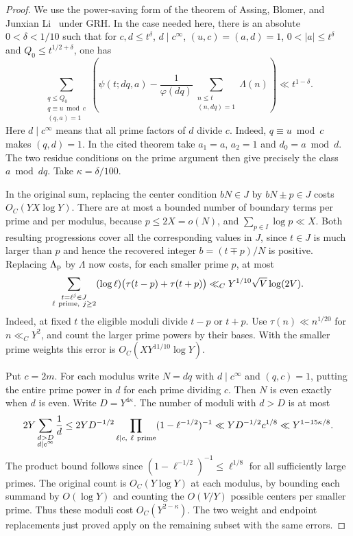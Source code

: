 \documentclass[11pt,a4paper]{article}
\numberwithin{equation}{section}
\begin{document}
\begin{proof}
We use the power-saving form of the theorem of Assing, Blomer,
and Junxian Li~\cite[Theorem~2.1]{AssingBlomerLi} under GRH.
In the case needed here, there is an absolute $0<\delta<1/10$
such that for $c,d\le t^\delta$, $d\mid c^\infty$,
$(u,c)=(a,d)=1$, $0<|a|\le t^\delta$ and $Q_0\le t^{1/2+\delta}$,
one has
\begin{equation}
 \sum_{\substack{q\le Q_0\\q\equiv u\bmod c\\(q,a)=1}}
 \left(
  \psi(t;dq,a)
     -\frac{1}{\varphi(dq)}\sum_{\substack{n\le t\\(n,dq)=1}}\Lambda(n)
 \right)
 \ll t^{1-\delta}.
 \label{eq:criticalgridmodulusabl}
\end{equation}
Here $d\mid c^\infty$ means that all prime factors of $d$
divide $c$. Indeed, $q\equiv u\bmod c$ makes $(q,d)=1$.
In the cited theorem take $a_1=a$, $a_2=1$ and $d_0=a\bmod d$.
The two residue conditions on the prime argument then give
precisely the class $a\bmod dq$. Take $\kappa=\delta/100$.

In the original sum, replacing the center condition $bN\in J$
by $bN\pm p\in J$ costs $O_C(YX\log Y)$. There are at most a
bounded number of boundary terms per prime and per modulus,
because $p\le2X=o(N)$, and $\sum_{p\in I}\log p\ll X$.
Both resulting progressions cover all the corresponding values
in $J$, since $t\in J$ is much larger than $p$ and hence the
recovered integer $b=(t\mp p)/N$ is positive.
Replacing $\Lambda_{\rm p}$ by $\Lambda$ now costs, for each
smaller prime $p$, at most
\[
 \sum_{\substack{t=\ell^j\in J\\\ell\ {\rm prime},\ j\ge2}}
       (\log\ell)\bigl(\tau(t-p)+\tau(t+p)\bigr)
 \ll_C Y^{1/10}\sqrt V\log(2V).
\]
Indeed, at fixed $t$ the eligible moduli divide $t-p$ or $t+p$.
Use $\tau(n)\ll n^{1/20}$ for $n\ll_C Y^2$, and count the
larger prime powers by their bases. With the smaller prime weights
this error is $O_C(XY^{11/10}\log Y)$.

Put $c=2m$. For each modulus write $N=dq$ with
$d\mid c^\infty$ and $(q,c)=1$, putting the entire prime power
in $d$ for each prime dividing $c$. Then $N$ is even exactly
when $d$ is even. Write $D=Y^{4\kappa}$.
The number of moduli with $d>D$ is at most
\[
 2Y\sum_{\substack{d>D\\d\mid c^\infty}}\frac1d
 \le 2Y D^{-1/2}\prod_{\ell\mid c,\ \ell\ {\rm prime}}
                            (1-\ell^{-1/2})^{-1}
 \ll Y D^{-1/2} c^{1/8}
 \ll Y^{1-15\kappa/8}.
\]
The product bound follows since $(1-\ell^{-1/2})^{-1}\le
\ell^{1/8}$ for all sufficiently large primes. The original
count is $O_C(Y\log Y)$ at each modulus, by bounding each summand
by $O(\log Y)$ and counting the $O(V/Y)$ possible centers per
smaller prime. Thus these moduli cost $O_C(Y^{2-\kappa})$.
The two weight and endpoint replacements just proved apply
on the remaining subset with the same errors.


\end{proof}
\end{document}

